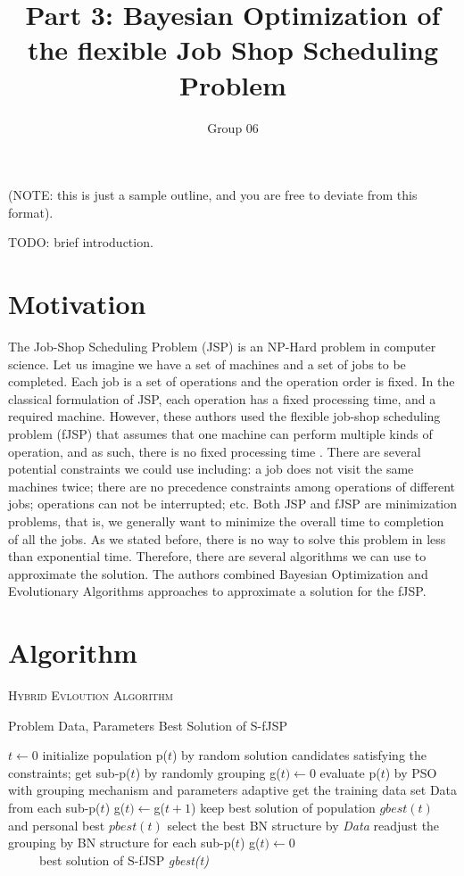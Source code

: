 \documentclass[11pt]{article}
\title{Part 3: Bayesian Optimization of the flexible Job Shop Scheduling Problem}
\author{Group 06}
\begin{document}
\maketitle

(NOTE: this is just a sample outline, and you are free to deviate from this 
format).

TODO: brief introduction.

\section{Motivation}
The Job-Shop Scheduling Problem (JSP) is an NP-Hard problem in computer science\cite{cheng1996tutorial}. Let us imagine we have a set of machines and a set of jobs to be completed. Each job is a set of operations and the operation order is fixed. In the classical formulation of JSP, each operation has a fixed processing time, and a required machine. However, these authors used the flexible job-shop scheduling problem (fJSP) that assumes that one machine can perform multiple kinds of operation, and as such, there is no fixed processing time \cite{sun2015bayesian}. There are several potential constraints we could use including: a job does not visit the same machines twice; there are no precedence constraints among operations of different jobs; operations can not be interrupted; etc. Both JSP and fJSP are minimization problems, that is, we generally want to minimize the overall time to completion of all the jobs. As we stated before, there is no way to solve this problem in less than exponential time. Therefore, there are several algorithms we can use to approximate the solution. The authors combined Bayesian Optimization and Evolutionary Algorithms approaches to approximate a solution for the fJSP. 

\newpage
\section{Algorithm}

\begin{algorithm}\caption{\textsc{Hybrid Evloution Algorithm}}
 \begin{algorithmic}[1]
    Problem Data, Parameters
    Best Solution of S-fJSP
   
   \State $t \gets 0$
   \State initialize population p($t$) by random solution candidates satisfying the constraints;
 get sub-p($t$) by randomly grouping
 	\State g($t) \gets 0$
	\State evaluate p($t$) by PSO with grouping mechanism and parameters adaptive
 	\State get the training data set Data from each sub-p($t$)
 	\State g($t) \gets $g($t + 1$)
 	\State keep best solution of population $gbest(t)$ and personal best $pbest(t)$
 	\State select the best BN structure by \textit{Data}
 	\State readjust the grouping by BN structure for each sub-p($t$)
 	\State g($t) \gets 0$
 	\EndIf
        \EndWhile\\
~~~~~\Return best solution of S-fJSP \textit{gbest(t)}
 \end{algorithmic}
\end{algorithm}
\end{document}
